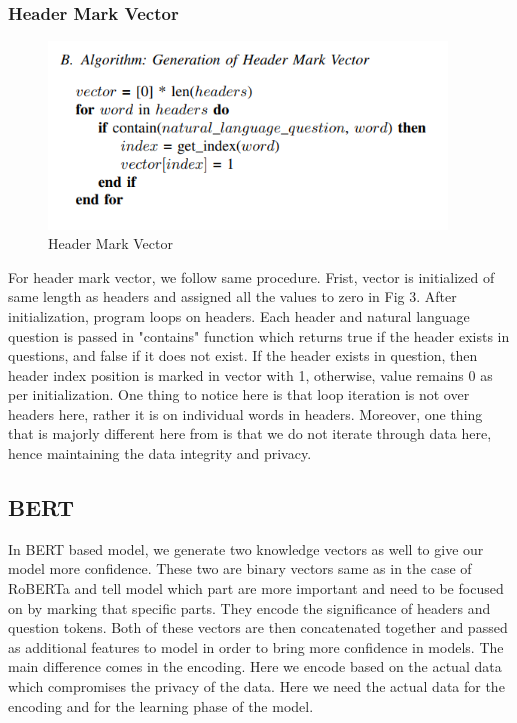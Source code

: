 \documentclass[12pt]{article}
\begin{document}
\subsubsection{Header Mark Vector}
\begin{figure}[H]
    \includegraphics[width=300pt]{HMV}
    \caption{Header Mark Vector}
    \label{fig:Header mark vector}
\end{figure}

For header mark vector, we follow same procedure. Frist, vector is initialized of same length as headers and assigned all the values to zero in Fig 3. After initialization, program loops on headers. Each header and natural language question is passed in "contains" function which returns true if the header exists in questions, and false if it does not exist. If the header exists in question, then header index position is marked in vector with 1, otherwise, value remains 0 as per initialization. One thing to notice here is that loop iteration is not over headers here, rather it is on individual words in headers. Moreover, one thing that is majorly different here from \cite{guo2019content} is that we do not iterate through data here, hence maintaining the data integrity and privacy.


\subsection{BERT}
In BERT based model, we generate two knowledge vectors as well to give our model more confidence. These two are binary vectors same as in the case of RoBERTa and tell model which part are more important and need to be focused on by marking that specific parts. They encode the significance of headers and question tokens. Both of these vectors are then concatenated together and passed as additional features to model in order to bring more confidence in models. The main difference comes in the encoding. Here we encode based on the actual data which compromises the privacy of the data. Here we need the actual data for the encoding and for the learning phase of the model. 
\end{document}
